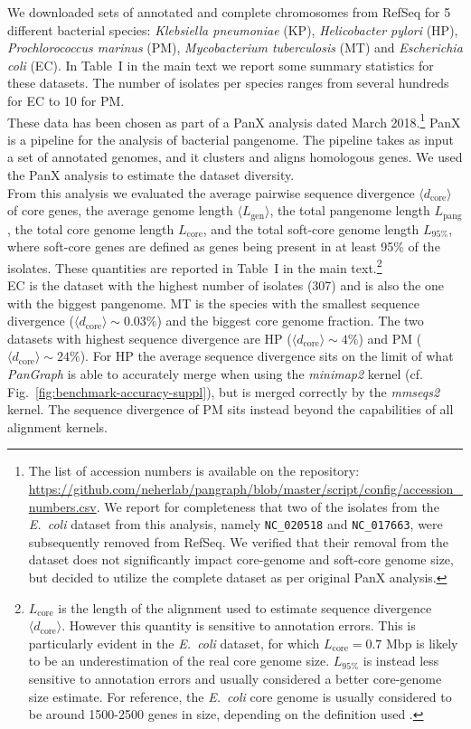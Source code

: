 \documentclass[aps,rmp,reprint,superscriptaddress,notitlepage,10pt,onecolumn]{revtex4-1}
\newcommand{\avg}[1]{\langle #1 \rangle}
\newcommand{\Lcore}{L_\text{core}}
\newcommand{\Lsoftcore}{L_\text{95\%}}
\newcommand{\Lpang}{L_\text{pang}}
\newcommand{\Lgen}{L_\text{gen}}
\newcommand{\dcore}{\langle d_\text{core} \rangle}
\begin{document}
We downloaded sets of annotated and complete chromosomes from RefSeq \cite{o2016reference} for 5 different bacterial species: \textit{Klebsiella pneumoniae} (KP), \textit{Helicobacter pylori} (HP), \textit{Prochlorococcus marinus} (PM), \textit{Mycobacterium tuberculosis} (MT) and \textit{Escherichia coli} (EC). In Table~I in the main text we report some summary statistics for these datasets. The number of isolates per species ranges from several hundreds for EC to 10 for PM.\\
These data has been chosen as part of a PanX \cite{ding2018panx} analysis dated March 2018.\footnote{
    The list of accession numbers is available on the repository: \url{https://github.com/neherlab/pangraph/blob/master/script/config/accession_numbers.csv}.
    We report for completeness that two of the isolates from the \textit{E.~coli} dataset from this analysis, namely \texttt{NC\_020518} and  \texttt{NC\_017663}, were subsequently removed from RefSeq. We verified that their removal from the dataset does not significantly impact core-genome and soft-core genome size, but decided to utilize the complete dataset as per original PanX analysis.
}
PanX is a pipeline for the analysis of bacterial pangenome. The pipeline takes as input a set of annotated genomes, and it clusters and aligns homologous genes. We used the PanX analysis to estimate the dataset diversity.\\
From this analysis we evaluated the average pairwise sequence divergence $\avg{d_\text{core}}$ of core genes, the average genome length $\avg{\Lgen}$, the total pangenome length $\Lpang$, the total core genome length $\Lcore$, and the total soft-core genome length $\Lsoftcore$, where soft-core genes are defined as genes being present in at least 95\% of the isolates. These quantities are reported in Table~I in the main text.\footnote{
    $\Lcore$ is the length of the alignment used to estimate sequence divergence $\avg{d_\text{core}}$. However this quantity is sensitive to annotation errors. This is particularly evident in the \textit{E.~coli} dataset, for which $\Lcore = 0.7$ Mbp is likely to be an underestimation of the real core genome size. $\Lsoftcore$ is instead less sensitive to annotation errors and usually considered a better core-genome size estimate. For reference, the \textit{E.~coli} core genome is usually considered to be around 1500-2500 genes in size, depending on the definition used \cite{park2019large,sutton2021pan,horsfield2023accurate}.
}\\
EC is the dataset with the highest number of isolates (307) and is also the one with the biggest pangenome. MT is the species with the smallest sequence divergence ($\dcore \sim 0.03\%$) and the biggest core genome fraction. The two datasets with highest sequence divergence are HP ($\dcore \sim 4\%$) and PM ($\dcore \sim 24\%$). For HP the average sequence divergence sits on the limit of what \textit{PanGraph} is able to accurately merge when using the \textit{minimap2} kernel (cf. Fig.~\ref{fig:benchmark-accuracy-suppl}), but is merged correctly by the \textit{mmseqs2} kernel. The sequence divergence of PM sits instead beyond the capabilities of all alignment kernels.
\end{document}

